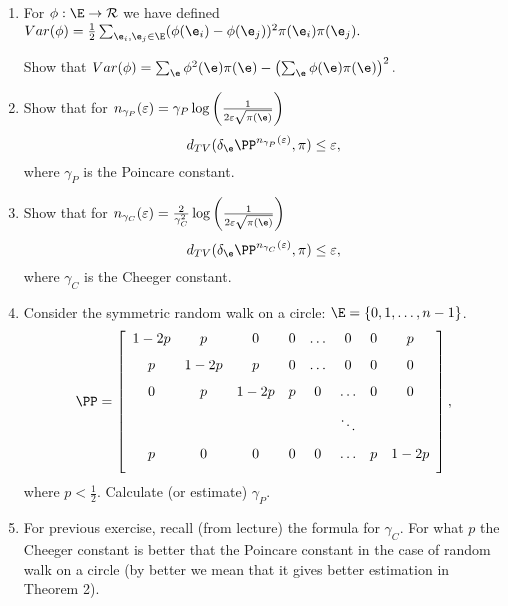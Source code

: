 \documentclass[a4paper,12pt]{article}
\begin{document}
\begin{enumerate}
\item 
  For $\phi:\E\to\mathcal{R}$ we have defined 
  $Var(\phi)={1\over 2}\sum_{\e_i, \e_j\in\E} (\phi(\e_i)-\phi(\e_j))^2 \pi(\e_i)\pi(\e_j).$\smallskip\par 
  Show that 
  $Var(\phi)=\sum_\e \phi^2(\e)\pi(\e)-\left(\sum_\e\phi(\e)\pi(\e)\right)^2.$ 

  
  \item
  Show that for $n_{\gamma_P}(\varepsilon)=\gamma_P \log\left({1\over 2\varepsilon\sqrt{\pi(\e)}}\right)$
$$d_{TV}(\delta_\e\PP^{n_{\gamma_P}(\varepsilon)},\pi)\leq \varepsilon,$$
where $\gamma_P$ is the Poincare constant.

\item
Show that for $n_{\gamma_C}(\varepsilon)={2\over \gamma_C^2} \log\left({1\over 2\varepsilon\sqrt{\pi(\e)}}\right)$
$$d_{TV}(\delta_\e\PP^{n_{\gamma_C}(\varepsilon)},\pi)\leq \varepsilon,$$
where $\gamma_C$ is the Cheeger constant.
 
\item  Consider the symmetric random walk on a circle: $\E=\{0,1,\ldots,n-1\}$.
$$\PP=\left[
\begin{array}{ccccccccc}
1-2p & p & 0 & 0  & \ldots & 0& 0 & p\\[7pt]
p & 1-2p & p & 0 & \ldots & 0 &0&0\\[7pt]
0 & p & 1-2p & p & 0 &\ldots & 0 &0\\[7pt]
  &    &     &   &   & \ddots & & \\[7pt]
p & 0 & 0 & 0 & 0 &\ldots & p &1-2p\\[7pt]
\end{array}\right],$$
where $p<\frac{1}{2}.$ Calculate (or estimate) $\gamma_P.$
 
\item For previous exercise, recall (from lecture) the formula for  $\gamma_C$. 
For what $p$ the Cheeger constant is better that the Poincare constant in the case of random walk on a circle (by better we mean that it gives better estimation in Theorem 2).
%  
 

\end{enumerate}
\end{document}

